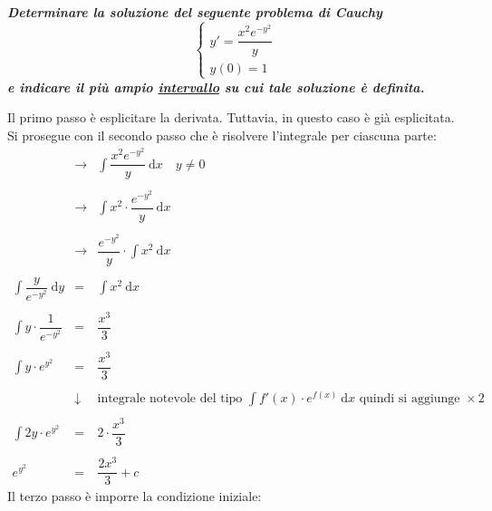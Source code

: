 \documentclass[a4paper]{article}
\begin{document}
	\textcolor{Green4}{\textbf{\emph{Determinare la soluzione del seguente problema di Cauchy}}}
	\begin{equation*}
		\begin{cases}
			y' = \dfrac{x^{2} e^{-y^{2}}}{y} \\
			y\left(0\right) = 1
		\end{cases}
	\end{equation*}
	\textcolor{Green4}{\textbf{\emph{e indicare il più ampio \underline{intervallo} su cui tale soluzione è definita.}}}\newline
		
	\noindent
	Il primo passo è esplicitare la derivata. Tuttavia, in questo caso è già esplicitata. Si prosegue con il secondo passo che è risolvere l'integrale per ciascuna parte:
	\begin{equation*}
		\begin{array}{rcl}
			&\rightarrow& \displaystyle\int\dfrac{x^{2} e^{-y^{2}}}{y} \: \mathrm{d}x \hspace{1em} y \ne 0 \\
			\\
			&\rightarrow& \displaystyle\int x^{2} \cdot \dfrac{e^{-y^{2}}}{y} \: \mathrm{d}x \\
			\\
			&\rightarrow& \dfrac{e^{-y^{2}}}{y} \cdot \displaystyle\int x^{2} \: \mathrm{d}x \\
			\\
			\displaystyle\int\dfrac{y}{e^{-y^{2}}} \: \mathrm{d}y &=& \displaystyle\int x^{2} \: \mathrm{d}x \\
			\\
			\displaystyle\int y \cdot \dfrac{1}{e^{-y^{2}}} &=& \dfrac{x^{3}}{3} \\
			\\
			\displaystyle\int y \cdot e^{y^{2}} &=& \dfrac{x^{3}}{3} \\
			\\
			&\downarrow& \text{integrale notevole del tipo } \displaystyle\int f'\left(x\right) \cdot e^{f\left(x\right)} \: \mathrm{d}x \text{ quindi si aggiunge }\times 2 \\
			\\
			\displaystyle\int 2 y \cdot e^{y^{2}} &=& 2 \cdot \dfrac{x^{3}}{3} \\
			\\
			e^{y^{2}} &=& \dfrac{2x^{3}}{3} + c
		\end{array}
	\end{equation*}
	Il terzo passo è imporre la condizione iniziale:
\end{document}
